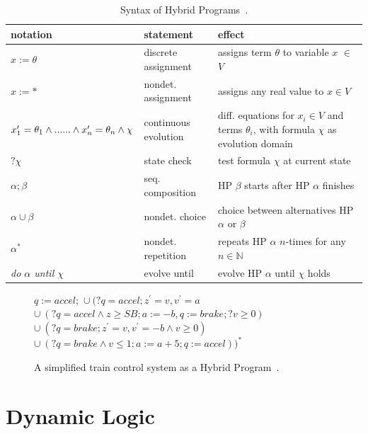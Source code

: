 \begin{table}
	\begin{tabular}{p{5cm} | p{4cm} | p{6cm} }
		notation & statement & effect \\ \hline
		\(x := \theta\) & discrete assignment & assigns term \(\theta\) to variable \(x\) \(\in\) \(V\) \\
		\(x := \ast\) & nondet. assignment & assigns any real value to \(x \in V\) \\
		\(x^{\prime}_1 = \theta_1 \wedge ... \newline
		... \wedge x^{\prime}_n = \theta_n \wedge \chi\) & continuous evolution & diff. equations for \(x_i \in V\) and terms \(\theta_i\),\newline
		with formula \(\chi\) as evolution domain \\
		\(?\chi\) & state check & test formula \(\chi\) at current state \\
		\(\alpha;\beta\) & seq. composition & HP \(\beta\) starts after HP \(\alpha\) finishes \\
		\(\alpha \cup \beta\) & nondet. choice & choice between alternatives HP \(\alpha\) or \(\beta\) \\
		\(\alpha^\ast\) & nondet. repetition & repeats HP \(\alpha\) \(n\)-times for any \(n \in \mathbb{N}\) \\
		\it{do} \(\alpha\) \it{until} \(\chi\) & evolve until &  evolve HP \(\alpha\) until \(\chi\) holds \\
	\end{tabular}
	\caption{Syntax of Hybrid Programs~\cite{platzer2010b}.}
	\label{tab:hp}
\end{table}

\begin{figure}[ht!]
	\(q := accel;\)\newline
	\(\cup~(?q = accel; z^{\prime}= v, v^{\prime}= a\) \newline
	\(\cup~(?q = accel \wedge z \geq SB; a := -b, q:= brake; ?v \geq 0)\) \newline
	\(\cup~(?q = brake; z^{\prime}=v, v^{\prime}= -b \wedge v \geq 0)\) \newline
	\(\cup~(?q = brake \wedge v \leq 1; a := a+5; q := accel))^\ast\)
	\caption{A simplified train control system as a Hybrid Program~\cite{platzer2010b}.}
	\label{fig:etcs_hp}
\end{figure}

\section{Dynamic Logic}
\label{sec:pre:DL}

